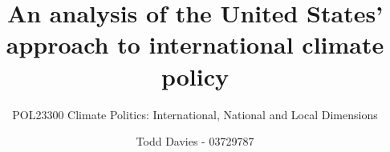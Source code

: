 \usepackage{microtype}
\usepackage{hyperref}

\usepackage{natbib}

\author{Todd Davies - 03729787}
\newcommand{\Title}{An analysis of the United States' approach to international climate policy}
\title{\Title}
\subtitle{POL23300 Climate Politics: International, National and Local Dimensions}
